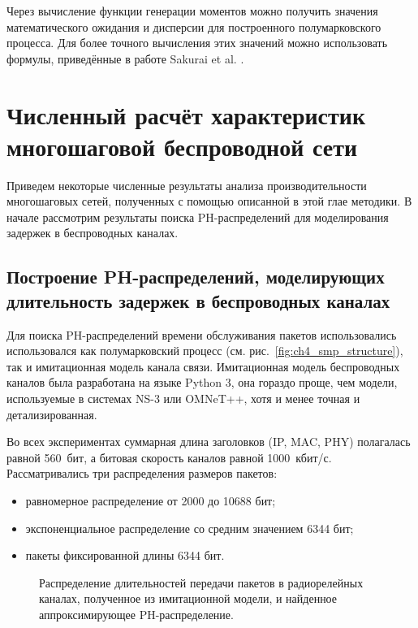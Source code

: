 Через вычисление функции генерации моментов можно получить значения математического ожидания и дисперсии для построенного полумарковского процесса. Для более точного вычисления этих значений можно использовать формулы, приведённые в работе Sakurai et al. \cite{Sakurai2007}.





\section{Численный расчёт характеристик многошаговой беспроводной сети}\label{sec:ch4_numeric_results}
Приведем некоторые численные результаты анализа производительности многошаговых сетей, полученных с помощью описанной в этой глае методики. В начале рассмотрим результаты поиска PH-распределений для моделирования задержек в беспроводных каналах.

\subsection{Построение PH-распределений, моделирующих длительность задержек в беспроводных каналах}
Для поиска PH-распределений времени обслуживания пакетов использовались использовался как полумарковский процесс (см. рис.~\ref{fig:ch4_smp_structure}), так и имитационная модель канала связи. Имитационная модель беспроводных каналов была разработана на языке Python 3, она гораздо проще, чем модели, используемые в системах NS-3 или OMNeT++, хотя и менее точная и детализированная.

Во всех экспериментах суммарная длина заголовков (IP, MAC, PHY) полагалась равной 560~бит, а битовая скорость каналов равной 1000~кбит/с. Рассматривались три распределения размеров пакетов: 

\begin{itemize}
	\item равномерное распределение от 2000 до 10688 бит;
	\item экспоненциальное распределение со средним значением 6344 бит;
	\item пакеты фиксированной длины 6344 бит.
\end{itemize}

\begin{figure}[h]
  \caption{Распределение длительностей передачи пакетов в радиорелейных каналах, полученное из имитационной модели, и найденное аппроксимирующее PH-распределение.}
  \label{fig:ch4_fitting_relay_delays}
\end{figure}

